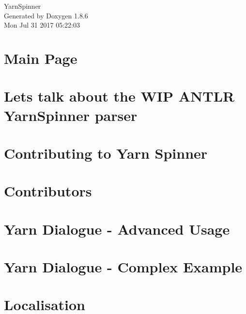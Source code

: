 \documentclass[twoside]{book}
\newcommand{\clearemptydoublepage}{%
  \newpage{\pagestyle{empty}\cleardoublepage}%
}
\begin{document}
\hypersetup{pageanchor=false}
\begin{titlepage}
\vspace*{7cm}
\begin{center}%
{\Large Yarn\-Spinner }\\
\vspace*{1cm}
{\large Generated by Doxygen 1.8.6}\\
\vspace*{0.5cm}
{\small Mon Jul 31 2017 05:22:03}\\
\end{center}
\end{titlepage}
\clearemptydoublepage
\tableofcontents
\clearemptydoublepage
{}
\hypersetup{pageanchor=true}

\chapter{Main Page}
\label{index}\hypertarget{index}{}
\chapter{Lets talk about the W\-I\-P A\-N\-T\-L\-R Yarn\-Spinner parser}
\label{a00002}
\hypertarget{a00002}{}

\chapter{Contributing to Yarn Spinner}
\label{a00004}
\hypertarget{a00004}{}

\chapter{Contributors}
\label{a00006}
\hypertarget{a00006}{}

\chapter{Yarn Dialogue -\/ Advanced Usage}
\label{a00008}
\hypertarget{a00008}{}

\chapter{Yarn Dialogue -\/ Complex Example}
\label{a00010}
\hypertarget{a00010}{}

\chapter{Localisation}
\label{a00012}
\hypertarget{a00012}{}

\end{document}
